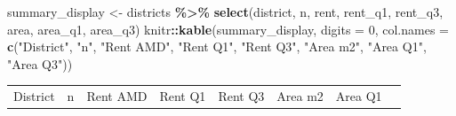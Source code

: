 \documentclass[
]{article}
\newenvironment{Shaded}{\begin{snugshade}}{\end{snugshade}}
\newcommand{\AttributeTok}[1]{\textcolor[rgb]{0.13,0.29,0.53}{#1}}
\newcommand{\DecValTok}[1]{\textcolor[rgb]{0.00,0.00,0.81}{#1}}
\newcommand{\FunctionTok}[1]{\textcolor[rgb]{0.13,0.29,0.53}{\textbf{#1}}}
\newcommand{\NormalTok}[1]{#1}
\newcommand{\OtherTok}[1]{\textcolor[rgb]{0.56,0.35,0.01}{#1}}
\newcommand{\SpecialCharTok}[1]{\textcolor[rgb]{0.81,0.36,0.00}{\textbf{#1}}}
\newcommand{\StringTok}[1]{\textcolor[rgb]{0.31,0.60,0.02}{#1}}
\newcounter{none} %
\begin{document}
\begin{Shaded}
\begin{Highlighting}[]
\NormalTok{summary\_display }\OtherTok{\textless{}{-}}\NormalTok{ districts }\SpecialCharTok{\%\textgreater{}\%} \FunctionTok{select}\NormalTok{(district, n, rent, rent\_q1, rent\_q3, area, area\_q1, area\_q3)}
\NormalTok{knitr}\SpecialCharTok{::}\FunctionTok{kable}\NormalTok{(summary\_display, }\AttributeTok{digits =} \DecValTok{0}\NormalTok{, }\AttributeTok{col.names =} \FunctionTok{c}\NormalTok{(}\StringTok{"District"}\NormalTok{, }\StringTok{"n"}\NormalTok{, }\StringTok{"Rent AMD"}\NormalTok{, }\StringTok{"Rent Q1"}\NormalTok{, }\StringTok{"Rent Q3"}\NormalTok{, }\StringTok{"Area m2"}\NormalTok{, }\StringTok{"Area Q1"}\NormalTok{, }\StringTok{"Area Q3"}\NormalTok{))}
\end{Highlighting}
\end{Shaded}

{\def\LTcaptype{none} %
\begin{longtable}[]{@{}
  >{\raggedright\arraybackslash}p{}
  >{\raggedleft\arraybackslash}p{}
  >{\raggedleft\arraybackslash}p{}
  >{\raggedleft\arraybackslash}p{}
  >{\raggedleft\arraybackslash}p{}
  >{\raggedleft\arraybackslash}p{}
  >{\raggedleft\arraybackslash}p{}
  >{\raggedleft\arraybackslash}p{}@{}}
\toprule\noalign{}
\begin{minipage}[b]{\linewidth}\raggedright
District
\end{minipage} & \begin{minipage}[b]{\linewidth}\raggedleft
n
\end{minipage} & \begin{minipage}[b]{\linewidth}\raggedleft
Rent AMD
\end{minipage} & \begin{minipage}[b]{\linewidth}\raggedleft
Rent Q1
\end{minipage} & \begin{minipage}[b]{\linewidth}\raggedleft
Rent Q3
\end{minipage} & \begin{minipage}[b]{\linewidth}\raggedleft
Area m2
\end{minipage} & \begin{minipage}[b]{\linewidth}\raggedleft
Area Q1
\end{minipage} & \begin{minipage}[b]{\linewidth}\raggedleft

\end{minipage}
\end{longtable}}
\end{document}
